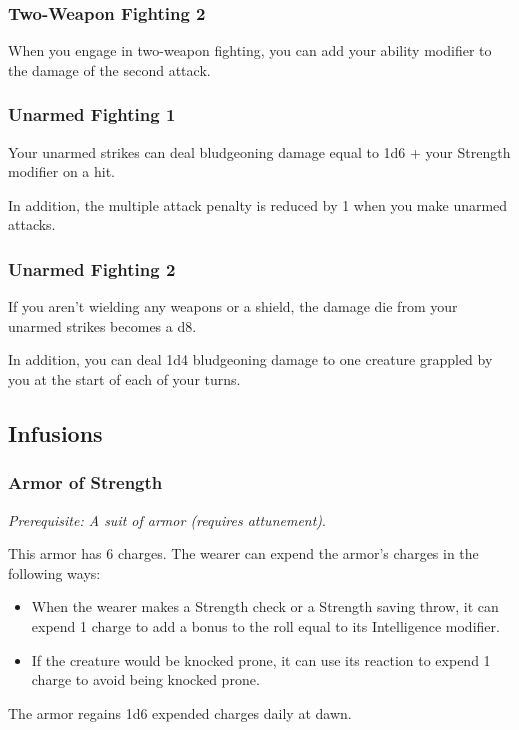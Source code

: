     \subsubsection{Two-Weapon Fighting 2}
        When you engage in two-weapon fighting, you can add your ability modifier to the damage of the second attack.
    \subsubsection{Unarmed Fighting 1}
        Your unarmed strikes can deal bludgeoning damage equal to 1d6 + your Strength modifier on a hit.

        In addition, the multiple attack penalty is reduced by 1 when you make unarmed attacks.
    \subsubsection{Unarmed Fighting 2}
        If you aren't wielding any weapons or a shield, the damage die from your unarmed strikes becomes a d8.

        In addition, you can deal 1d4 bludgeoning damage to one creature grappled by you at the start of each of your turns.


\subsection*{Infusions} \label{ssec::infusions}
    \subsubsection{Armor of Strength}
        \textit{Prerequisite: A suit of armor (requires attunement)}.

        This armor has 6 charges. The wearer can expend the armor's charges in the following ways:
        \begin{itemize}
            \item When the wearer makes a Strength check or a Strength saving throw, it can expend 1 charge to add a bonus to the roll equal to its Intelligence modifier.
            \item If the creature would be knocked prone, it can use its reaction to expend 1 charge to avoid being knocked prone.
        \end{itemize}
        The armor regains 1d6 expended charges daily at dawn.
